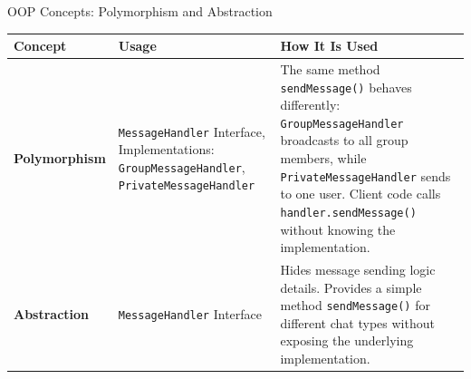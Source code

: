 \documentclass[aspectratio=1610]{beamer}
\begin{document}
\begin{frame}{OOP Concepts: Polymorphism and Abstraction}
\small
\begin{minipage}{0.99\linewidth}

\renewcommand{\arraystretch}{1.3}
\begin{tabular}{>{\bfseries}m{3.3cm} m{4.2cm} m{5.5cm}}
\toprule
Concept & Usage & How It Is Used \\
\midrule
Polymorphism & \texttt{MessageHandler} Interface, Implementations: \texttt{GroupMessageHandler}, \texttt{PrivateMessageHandler} & The same method \texttt{sendMessage()} behaves differently: \texttt{GroupMessageHandler} broadcasts to all group members, while \texttt{PrivateMessageHandler} sends to one user. Client code calls \texttt{handler.sendMessage()} without knowing the implementation. \\
\addlinespace
Abstraction & \texttt{MessageHandler} Interface & Hides message sending logic details. Provides a simple method \texttt{sendMessage()} for different chat types without exposing the underlying implementation. \\
\bottomrule
\end{tabular}
\end{minipage}
\end{frame}
\end{document}

